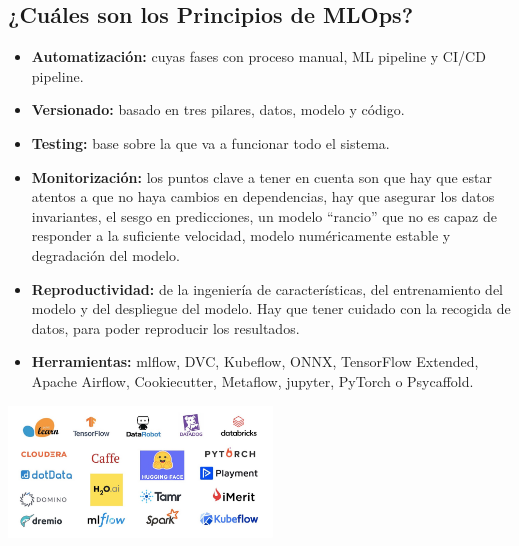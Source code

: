 \documentclass[twoside,twocolumn]{article}
\begin{document}
\subsection{¿Cuáles son los Principios de MLOps?}
\begin{itemize}
    \item \textbf{Automatización:} cuyas fases con proceso manual, ML pipeline y CI/CD pipeline.
    \item \textbf{Versionado:} basado en tres pilares, datos, modelo y código.
    \item \textbf{Testing:} base sobre la que va a funcionar todo el sistema.
    \item \textbf{Monitorización:} los puntos clave a tener en cuenta son que hay que estar atentos a que no haya cambios en dependencias, hay que asegurar los datos invariantes, el sesgo en predicciones, un modelo “rancio” que no es capaz de responder a la suficiente velocidad, modelo numéricamente estable y degradación del modelo.
    \item \textbf{Reproductividad:} de la ingeniería de características, del entrenamiento del modelo y del despliegue del modelo. Hay que tener cuidado con la recogida de datos, para poder reproducir los resultados.
    \item \textbf{Herramientas:} mlflow, DVC, Kubeflow, ONNX, TensorFlow Extended, Apache Airflow, Cookiecutter, Metaflow, jupyter, PyTorch o Psycaffold.    
\end{itemize}
\begin{center}
    \includegraphics[width=7cm]{./img/img3.png}
\end{center}

\end{document}
